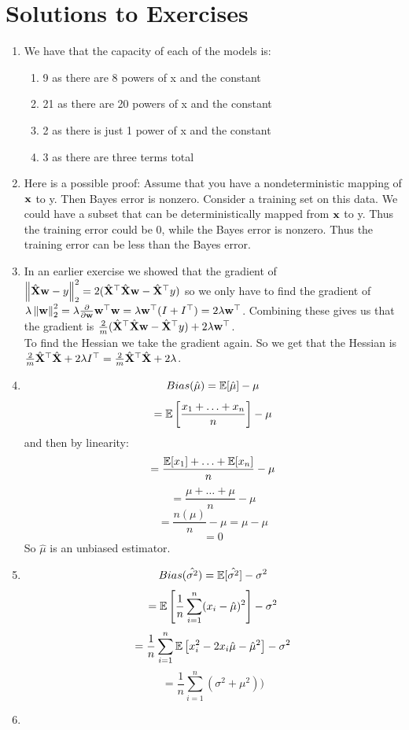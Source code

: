 \section{Solutions to Exercises}
\begin{enumerate}
    \item We have that the capacity of each of the models is:
    \begin{enumerate}
        \item 9 as there are 8 powers of x and the constant
        \item 21 as there are 20 powers of x and the constant
        \item 2 as there is just 1 power of x and the constant
        \item 3 as there are three terms total
    \end{enumerate}
    \item Here is a possible proof: Assume that you have a nondeterministic mapping of $\vx$ to y. Then Bayes error is nonzero. Consider a training set on this data. We could have a subset that can be deterministically mapped from $\vx$ to y. Thus the training error could be 0, while the Bayes error is nonzero. Thus the training error can be less than the Bayes error.
    \item In an earlier exercise we showed that the gradient of $\norm{\hat{\MX}\vw-y}_2^2=2(\hat{\MX}^\top\hat{\MX}\vw-\hat{\MX}^\top y)$ so we only have to find the gradient of $\lambda\norm{\vw}_2^2=\lambda\frac{\partial}{\partial\vw}\vw^\top\vw=\lambda\vw^\top(I+I^\top)=2\lambda\vw^\top$. Combining these gives us that the gradient is $\frac{2}{m}(\hat{\MX}^\top\hat{\MX}\vw-\hat{\MX}^\top y)+2\lambda\vw^\top$.\\
    To find the Hessian we take the gradient again. So we get that the Hessian is $\frac{2}{m}\hat{\MX}^\top\hat{\MX}+2\lambda I^\top=\frac{2}{m}\hat{\MX}^\top\hat{\MX}+2\lambda$.
    \item \[Bias(\hat{\mu}) = \Ev[\hat{\mu}] - \mu \]
    \[ = \Ev\left[\frac{x_{1} + \ldots + x_{n}}{n}\right] - \mu\]
    and then by linearity:
    \[ = \frac{\Ev[x_{1}] + \ldots + \Ev[x_{n}]}{n} - \mu\]
    \[ = \frac{\mu + \ldots + \mu}{n} - \mu\]
    \[ = \frac{n(\mu)}{n} - \mu = \mu - \mu\]
    \[ = 0\]
    So $\hat{\mu}$ is an unbiased estimator.
    \item \[Bias(\hat{\sigma^{2}}) = \Ev[\hat{\sigma^{2}}] - \sigma^{2} \]
    \[= \Ev\left[\frac{1}{n} \sum_{i = 1}^{n}(x_{i} - \hat{\mu})^{2}\right] - \sigma^{2} \]
    \[= \frac{1}{n}\sum_{i = 1}^{n}\Ev\left[x_{i}^{2} - 2x_{i}\hat{\mu}- \hat{\mu}^{2}\right]  - \sigma^{2}\]
    \[= \frac{1}{n}\sum_{i=1}^{n}(\sigma^{2} + \mu^{2}) ) \]
    \item
\end{enumerate}

